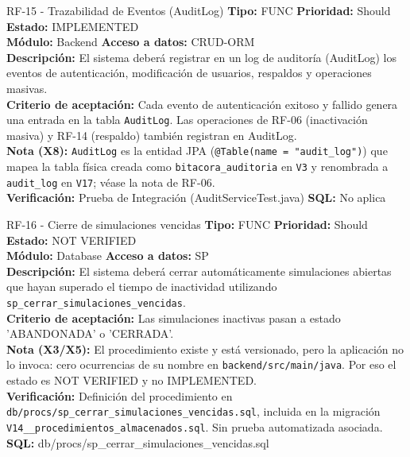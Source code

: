 \documentclass[11pt,a4paper]{article}
\begin{document}
\begin{requisito}{RF-15 - Trazabilidad de Eventos (AuditLog)}
    \textbf{Tipo:} FUNC \quad \textbf{Prioridad:} Should \quad \textbf{Estado:} IMPLEMENTED \\[0.2cm]
    \textbf{Módulo:} Backend \quad \textbf{Acceso a datos:} CRUD-ORM \\[0.2cm]
    \textbf{Descripción:} El sistema deberá registrar en un log de auditoría (AuditLog) los eventos de autenticación, modificación de usuarios, respaldos y operaciones masivas. \\[0.2cm]
    \textbf{Criterio de aceptación:} Cada evento de autenticación exitoso y fallido genera una entrada en la tabla \texttt{AuditLog}. Las operaciones de RF-06 (inactivación masiva) y RF-14 (respaldo) también registran en AuditLog. \\[0.2cm]
    \textbf{Nota (X8):} \texttt{AuditLog} es la entidad JPA (\texttt{@Table(name = "audit\_log")}) que mapea la tabla física creada como \texttt{bitacora\_auditoria} en \texttt{V3} y renombrada a \texttt{audit\_log} en \texttt{V17}; véase la nota de RF-06. \\[0.2cm]
    \textbf{Verificación:} Prueba de Integración (AuditServiceTest.java) \quad \textbf{SQL:} No aplica
\end{requisito}

\begin{requisito}{RF-16 - Cierre de simulaciones vencidas}
    \textbf{Tipo:} FUNC \quad \textbf{Prioridad:} Should \quad \textbf{Estado:} NOT VERIFIED \\[0.2cm]
    \textbf{Módulo:} Database \quad \textbf{Acceso a datos:} SP \\[0.2cm]
    \textbf{Descripción:} El sistema deberá cerrar automáticamente simulaciones abiertas que hayan superado el tiempo de inactividad utilizando \texttt{sp\_cerrar\_simulaciones\_vencidas}. \\[0.2cm]
    \textbf{Criterio de aceptación:} Las simulaciones inactivas pasan a estado 'ABANDONADA' o 'CERRADA'. \\[0.2cm]
    \textbf{Nota (X3/X5):} El procedimiento existe y está versionado, pero la aplicación no lo invoca: cero ocurrencias de su nombre en \texttt{backend/src/main/java}. Por eso el estado es NOT VERIFIED y no IMPLEMENTED. \\[0.2cm]
    \textbf{Verificación:} Definición del procedimiento en \texttt{db/procs/sp\_cerrar\_simulaciones\_vencidas.sql}, incluida en la migración \texttt{V14\_\_procedimientos\_almacenados.sql}. Sin prueba automatizada asociada. \quad \textbf{SQL:} db/procs/sp\_cerrar\_simulaciones\_vencidas.sql
\end{requisito}
\end{document}
